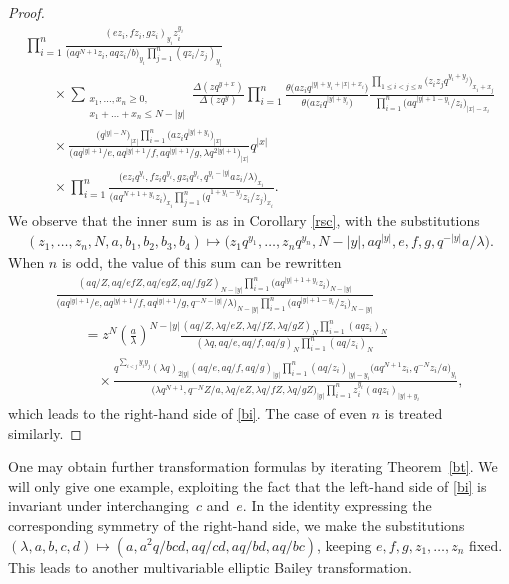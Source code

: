 \documentclass[pdftex]{sigma}
\numberwithin{equation}{section}
\begin{document}
\begin{proof}
\begin{gather*}
\prod\limits_{i=1}^n\frac{(ez_i,fz_i,gz_i)_{y_i}z_i^{y_i}}{\big(aq^{N+1}z_i,aqz_i/b\big)_{y_i}\prod\limits_{j=1}^n(qz_i/z_j)_{y_i}}\\
\qquad{} \times\sum_{\substack{x_1,\dots,x_n\geq 0,\\x_1+\dots+x_n\leq N-|y|}}
\frac{\Delta(zq^{y+x})}{\Delta(zq^y)}\prod\limits_{i=1}^n\frac{\theta\big(az_iq^{|y|+y_i+|x|+x_i}\big)}{\theta\big(az_iq^{|y|+y_i}\big)}\frac{\prod\limits_{1\leq i<j\leq n}\big(z_iz_jq^{y_i+y_j}\big)_{x_i+x_j}}{\prod\limits_{i=1}^n\big(aq^{|y|+1-y_i}/z_i\big)_{|x|-x_i}}\\
\qquad{} \times\frac{\big(q^{|y|-N}\big)_{|x|}\prod\limits_{i=1}^n\big(az_iq^{|y|+y_i}\big)_{|x|}}{\big(aq^{|y|+1}/e,aq^{|y|+1}/f,aq^{|y|+1}/g,\lambda q^{2|y|+1}\big)_{|x|}} q^{|x|}\\
\qquad{}\times\prod\limits_{i=1}^n\frac{\big(ez_iq^{y_i},fz_iq^{y_i},gz_iq^{y_i},q^{y_i-|y|}az_i/\lambda\big)_{x_i}}
{\big(aq^{N+1+y_i}z_i\big)_{x_i}\prod\limits_{j=1}^n\big(q^{1+y_i-y_j}z_i/z_j\big)_{x_i}}.
\end{gather*}
We observe that the inner sum is as in Corollary \ref{rsc}, with the substitutions
\begin{gather*}(z_1,\dots,z_n,N,a,b_1,b_2,b_3,b_4)\mapsto \big(z_1q^{y_1},\dots,z_nq^{y_n},N-|y|,aq^{|y|},e,f,g,q^{-|y|}a/\lambda\big). \end{gather*}
When $n$ is odd, the value of this sum can be rewritten
\begin{gather*}
\frac{(aq/Z,aq/efZ,aq/egZ,aq/fgZ)_{N-|y|}\prod\limits_{i=1}^n\big(aq^{|y|+1+y_i}z_i\big)_{N-|y|}}
{\big(aq^{|y|+1}/e,aq^{|y|+1}/f,aq^{|y|+1}/g,q^{-N-|y|}/\lambda\big)_{N-|y|}\prod\limits_{i=1}^n\big(aq^{|y|+1-y_i}/z_i\big)_{N-|y|}}\\
\qquad{} =z^N\left(\frac{a}{\lambda}\right)^{N-|y|}\frac{(aq/Z,\lambda q/eZ,\lambda q/fZ,\lambda q/gZ)_N\prod\limits_{i=1}^n(aqz_i)_N}{(\lambda q,aq/e,aq/f,aq/g)_{N}\prod\limits_{i=1}^n(aq/z_i)_N}\\
\qquad\quad{} \times\frac{q^{\sum\limits_{i<j}y_iy_j}(\lambda q)_{2|y|}(aq/e,aq/f,aq/g)_{|y|}\prod\limits_{i=1}^n(aq/z_i)_{|y|-y_i}\big(aq^{N+1}z_i,q^{-N}z_i/a\big)_{y_i}}{\big(\lambda q^{N+1},q^{-N}Z/a,\lambda q/eZ,\lambda q/fZ,\lambda q/gZ\big)_{|y|}\prod\limits_{i=1}^n z_i^{y_i}(aqz_i)_{|y|+y_i}},
\end{gather*}
which leads to the right-hand side of \eqref{bi}. The case of even $n$ is treated similarly.
\end{proof}

One may obtain further transformation formulas by iterating Theorem~\ref{bt}. We will only give one example, exploiting the fact that the left-hand side of \eqref{bi} is invariant under interchan\-ging~$c$ and~$e$. In the identity expressing the corresponding symmetry of the right-hand side, we make the substitutions $(\lambda,a,b,c,d)\mapsto(a,a^2q/bcd,aq/cd,aq/bd,aq/bc)$, keeping $e,f,g,z_1,\dots,z_n$ f\/ixed. This leads to another multivariable elliptic Bailey transformation.
\end{document}
